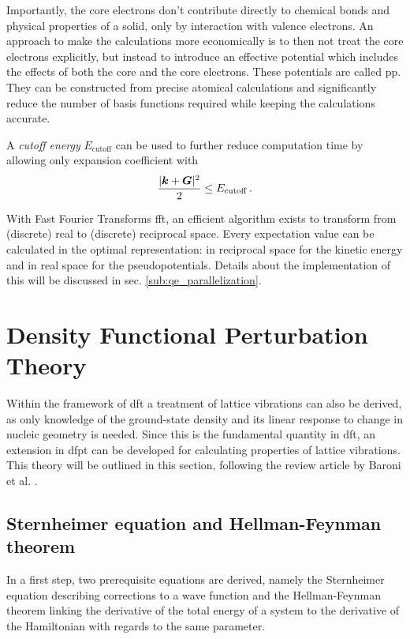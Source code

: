 \documentclass[main.tex]{subfiles}
\begin{document}
Importantly, the core electrons don't contribute directly to chemical bonds and physical properties of a solid, only by interaction with valence electrons.
An approach to make the calculations more economically is to then not treat the core electrons explicitly, but instead to introduce an effective potential which includes the effects of both the core and the core electrons.
These potentials are called \acrfull{pp}.
They can be constructed from precise atomical calculations and significantly reduce the number of basis functions required while keeping the calculations accurate.

A \emph{cutoff energy} \(E_{\mathrm{cutoff}}\) can be used to further reduce computation time by allowing only expansion coefficient with 
\begin{equation}
    \frac{\vert \vb*{k} + \vb*{G} \vert^2}{2} \leq E_{\mathrm{cutoff}}\,.
\end{equation}

With Fast Fourier Transforms \gls{fft}, an efficient algorithm exists to transform from (discrete) real to (discrete) reciprocal space.
Every expectation value can be calculated in the optimal representation: in reciprocal space for the kinetic energy and in real space for the pseudopotentials.
Details about the implementation of this will be discussed in sec. \ref{sub:qe_parallelization}.

\section{Density Functional Perturbation Theory}\label{sec:theory_dfpt}

Within the framework of \acrshort{dft} a treatment of lattice vibrations can also be derived, as only knowledge of the ground-state density and its linear response to change in nucleic geometry is needed.
Since this is the fundamental quantity in \acrshort{dft}, an extension in \acrshort{dfpt} can be developed for calculating properties of lattice vibrations.
This theory will be outlined in this section, following the review article by Baroni et al. \cite{baroni_phonons_2001}.

\subsection{Sternheimer equation and Hellman-Feynman theorem}

In a first step, two prerequisite equations are derived, namely the Sternheimer equation describing corrections to a wave function and the Hellman-Feynman theorem linking the derivative of the total energy of a system to the derivative of the Hamiltonian with regards to the same parameter.
\end{document}
